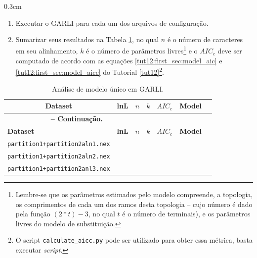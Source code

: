 \begin{refsection}
\begin {myindentpar}{0.3cm}
\begin{enumerate}[\itshape 1.]
    \item{Executar o GARLI para cada um dos arquivos de configuração.}

    \item{Sumarizar seus resultados na Tabela \ref{tut13:ex:13.2}, no qual $n$ é o número de caracteres em seu alinhamento, $k$ é o número de parâmetros livres\footnote{ Lembre-se que os parâmetros estimados pelo modelo compreende, a topologia, os comprimentos de cada um dos ramos desta topologia  -- cujo número é dado pela função $(2*t)-3$, no qual $t$ é o número de terminais), e os parâmetros livres do modelo de substituição.} e o $AIC_{c}$ deve ser computado de acordo com as equações \ref{tut12:first_sec:model_aic} e \ref{tut12:first_sec:model_aicc} do Tutorial \ref{tut12}\footnote{ O script \texttt{calculate\_aicc.py} pode ser utilizado para obter essa métrica, basta executar \textit{script}.}.}

\end{enumerate}
\end{myindentpar}


\pagestyle{fancy}
\begin{center}

\begin{longtable}{|l|>{\centering}m{2cm}|>{\centering}m{1cm}|c|>{\centering}m{2cm}|>{\centering}m{2cm} |@{}m{0pt}@{}}
\caption[Análise de modelo único em GARLI.]{Análise de modelo único em GARLI.} \label{tut13:ex:13.2} \\

\hline\hline  \multicolumn{1}{|c|}{\textbf{Dataset}} & \textbf{lnL}  & \textbf{$n$} & \textbf{$k$} & \textbf{$AIC_{c}$} & \textbf{Model} &\\
\endfirsthead

\multicolumn{3}{c}{{\bfseries \tablename\ \thetable{} -- Continuação.}}\\
\hline\hline \textbf{Dataset} & \textbf{lnL}  & \textbf{$n$} & \textbf{$k$} & \textbf{$AIC_{c}$} & \textbf{Model} &\\
\endhead
\hline \hline
\endlastfoot
\hline \scriptsize\texttt{partition1+partition2aln1.nex} & & & & & &\\
\hline \scriptsize\texttt{partition1+partition2aln2.nex} & & & & & &\\
\hline \scriptsize\texttt{partition1+partition2anl3.nex} & & & & & &\\
\end{longtable}
\end{center}




\end{refsection}
